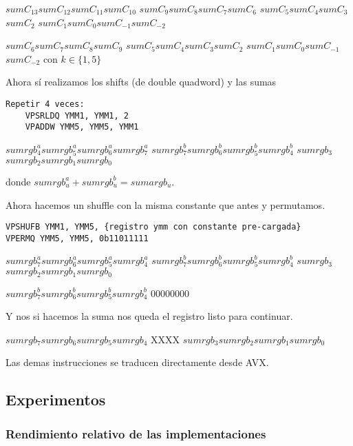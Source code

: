  \ymmWord
{$sumC_{13}$}{$sumC_{12}$}{$sumC_{11}$}{$sumC_{10}$}
{$sumC_9$}{$sumC_8$}{$sumC_7$}{$sumC_6$}
{$sumC_5$}{$sumC_4$}{$sumC_3$}{$sumC_2$}
{$sumC_1$}{$sumC_0$}{$sumC_{-1}$}{$sumC_{-2}$}

 
{$sumC_6$}{$sumC_7$}{$sumC_8$}{$sumC_9$}
{$sumC_5$}{$sumC_4$}{$sumC_3$}{$sumC_2$}
{$sumC_1$}{$sumC_0$}{$sumC_{-1}$}{$sumC_{-2}$}
con $k \in \{1,5\}$

Ahora sí realizamos los shifts (de double quadword) y las sumas

\begin{lstlisting}
Repetir 4 veces:
    VPSRLDQ YMM1, YMM1, 2
    VPADDW YMM5, YMM5, YMM1
\end{lstlisting}

 
{$sumrgb^a_4$}{$sumrgb^a_5$}{$sumrgb^a_6$}{$sumrgb^a_7$}
{$sumrgb^b_7$}{$sumrgb^b_6$}{$sumrgb^b_5$}{$sumrgb^b_4$}
{$sumrgb_3$}{$sumrgb_2$}{$sumrgb_1$}{$sumrgb_0$}

donde $sumrgb^a_u + sumrgb^b_u = sumargb_u$.

Ahora hacemos un shuffle con la misma constante que antes y permutamos.

\begin{lstlisting}
VPSHUFB YMM1, YMM5, {registro ymm con constante pre-cargada}
VPERMQ YMM5, YMM5, 0b11011111
\end{lstlisting}

 
{$sumrgb^a_7$}{$sumrgb^a_6$}{$sumrgb^a_5$}{$sumrgb^a_4$}
{$sumrgb^b_7$}{$sumrgb^b_6$}{$sumrgb^b_5$}{$sumrgb^b_4$}
{$sumrgb_3$}{$sumrgb_2$}{$sumrgb_1$}{$sumrgb_0$}

 
{$sumrgb^b_7$}{$sumrgb^b_6$}{$sumrgb^b_5$}{$sumrgb^b_4$}
{0}{0}{0}{0}{0}{0}{0}{0}

Y nos si hacemos la suma nos queda el registro listo para continuar.

 
{$sumrgb_7$}{$sumrgb_6$}{$sumrgb_5$}{$sumrgb_4$}
{X}{X}{X}{X}
{$sumrgb_3$}{$sumrgb_2$}{$sumrgb_1$}{$sumrgb_0$}

Las demas instrucciones se traducen directamente desde AVX.

\subsection{Experimentos}

\subsubsection{Rendimiento relativo de las implementaciones}

